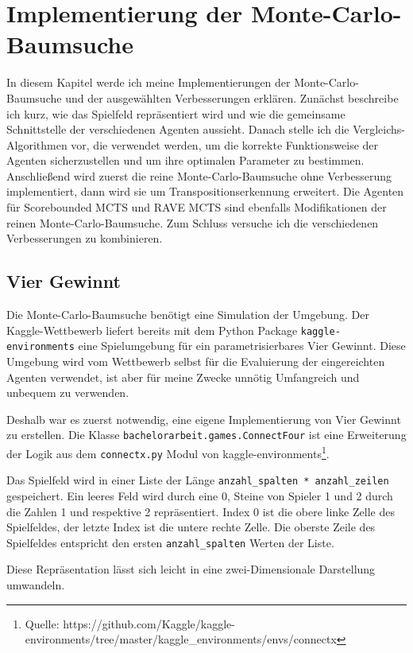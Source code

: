 \section{Implementierung der Monte-Carlo-Baumsuche}
\label{chap:mcts-impl}

In diesem Kapitel werde ich meine Implementierungen der Monte-Carlo-Baumsuche und der ausgewählten Verbesserungen erklären.
Zunächst beschreibe ich kurz, wie das Spielfeld repräsentiert wird und wie die gemeinsame Schnittstelle der verschiedenen Agenten aussieht.
Danach stelle ich die Vergleichs-Algorithmen vor, die verwendet werden, um die korrekte Funktionsweise der Agenten sicherzustellen und um ihre optimalen Parameter zu bestimmen.
Anschließend wird zuerst die reine Monte-Carlo-Baumsuche ohne Verbesserung implementiert, dann wird sie um Transpositionserkennung erweitert.
Die Agenten für Scorebounded MCTS und RAVE MCTS sind ebenfalls Modifikationen der reinen Monte-Carlo-Baumsuche. Zum Schluss versuche ich die verschiedenen Verbesserungen zu kombinieren.

\subsection{Vier Gewinnt}
\label{chap:viergewinnt-impl}
Die Monte-Carlo-Baumsuche benötigt eine Simulation der Umgebung.
Der Kaggle-Wettbewerb liefert bereits mit dem Python Package \verb|kaggle-environments| eine Spielumgebung für ein parametrisierbares Vier Gewinnt.
Diese Umgebung wird vom Wettbewerb selbst für die Evaluierung der eingereichten Agenten verwendet, ist aber für meine Zwecke unnötig Umfangreich und unbequem zu verwenden.

Deshalb war es zuerst notwendig, eine eigene Implementierung von Vier Gewinnt zu erstellen.
Die Klasse \verb|bachelorarbeit.games.ConnectFour| ist eine Erweiterung der Logik aus dem \verb|connectx.py| Modul von kaggle-environments\footnote{Quelle: https://github.com/Kaggle/kaggle-environments/tree/master/kaggle_environments/envs/connectx}.

Das Spielfeld wird in einer Liste der Länge \verb|anzahl_spalten * anzahl_zeilen| gespeichert.
Ein leeres Feld wird durch eine 0, Steine von Spieler 1 und 2 durch die Zahlen 1 und respektive 2 repräsentiert.
Index 0 ist  die obere linke Zelle des Spielfeldes, der letzte Index ist die untere rechte Zelle.
Die oberste Zeile des Spielfeldes entspricht den ersten \verb|anzahl_spalten| Werten der Liste.

Diese Repräsentation lässt sich leicht in eine zwei-Dimensionale Darstellung umwandeln.

